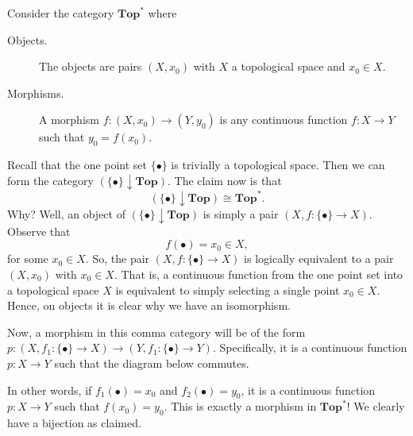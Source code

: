     \begin{example} 
        Consider the category $\textbf{Top}^*$ where 
        \begin{description}
            \item[Objects.] The objects are pairs $(X, x_0)$ with $X$ a topological space 
            and $x_0 \in X$.
            \item[Morphisms.] A morphism $f: (X, x_0) \to (Y, y_0)$ is any continuous function 
            $f: X \to Y$ such that $y_0 = f(x_0)$.  
        \end{description}
        Recall that the one point set $\{\bullet\}$ is trivially a topological space. 
        Then we can form the category $(\{\bullet\}\downarrow \textbf{Top})$. The claim now is that 
        \[
            (\{\bullet\}\downarrow \textbf{Top}) 
            \cong 
            \textbf{Top}^*.
        \]
        Why? Well, an object of $(\{\bullet\}\downarrow \textbf{Top})$ is simply 
        a pair $(X, f: \{\bullet\} \to X)$. Observe that 
        \[
            f(\bullet) = x_0 \in X,
        \]
        for some $x_0 \in  X$.
        So, the pair $(X, f: \{\bullet\} \to X)$ is logically equivalent to a 
        pair $(X, x_0)$ with $x_0 \in X$. \textcolor{NavyBlue}{That is, a continuous function
        from the one point set into a topological space $X$ is equivalent to simply selecting 
        a single point $x_0 \in X$}.  Hence, on objects it is clear why we have an isomorphism.

        Now, a morphism in this comma category will be of the form 
        $p: (X, f_1: \{\bullet\} \to X) \to (Y, f_1: \{\bullet\} \to Y)$. 
        Specifically, it is a continuous function $p: X \to Y$ such that the diagram below commutes. 
        \begin{center}
        \end{center}
        In other words, if $f_1(\bullet) = x_0$ and $f_2(\bullet) = y_0$, 
        it is a continuous function $p: X \to Y$ such that $f(x_0) = y_0$.
        This is exactly a morphism in $\textbf{Top}^*$! We clearly have a bijection 
        as claimed.
    \end{example}

